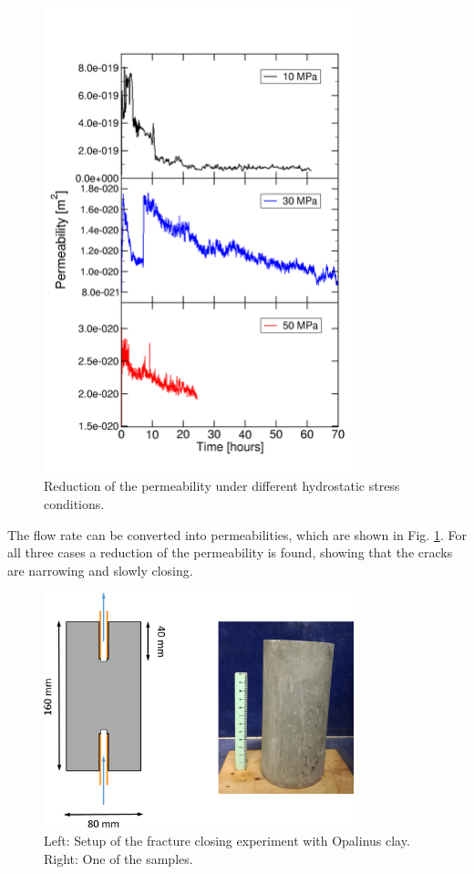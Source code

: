 \begin{figure}[!ht]
\centering
\includegraphics[width=9cm]{figures/mex3-perme-time-comparison.png}
\caption{Reduction of the permeability under different hydrostatic stress conditions.}
\label{fig:ME3-perme-exp}
\end{figure}

The flow rate can be converted into permeabilities, which are shown in Fig. \ref{fig:ME3-perme-exp}. For all three cases a reduction of the permeability is found,  showing that the cracks are narrowing and slowly closing. 

\begin{figure}[!ht]
\centering
\includegraphics[width=9cm]{figures/mex3-claysample.png}
\caption{Left: Setup of the fracture closing experiment with Opalinus clay. Right: One of the samples.}
\label{fig:ME3-clay-setup}
\end{figure}

